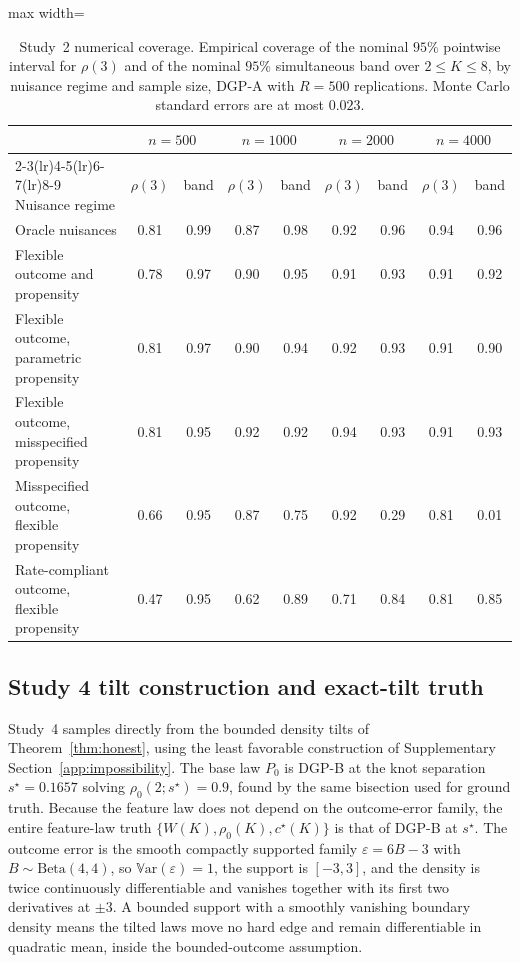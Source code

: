 \documentclass[11pt]{article}
\newcommand{\Var}{\mathbb V\mathrm{ar}}
\newcommand{\eps}{\varepsilon}
\begin{document}
\begin{table}[t]
\centering
\caption{Study~2 numerical coverage. Empirical coverage of the nominal $95\%$ pointwise interval for $\rho(3)$ and of the nominal $95\%$ simultaneous band over $2\le K\le8$, by nuisance regime and sample size, DGP-A with $R=500$ replications. Monte Carlo standard errors are at most $0.023$.}
\label{tab:sims:study2cov}
\begin{adjustbox}{max width=\textwidth}
\begin{tabular}{l cc cc cc cc}
\toprule
& \multicolumn{2}{c}{$n=500$} & \multicolumn{2}{c}{$n=1000$} & \multicolumn{2}{c}{$n=2000$} & \multicolumn{2}{c}{$n=4000$}\\
\cmidrule(lr){2-3}\cmidrule(lr){4-5}\cmidrule(lr){6-7}\cmidrule(lr){8-9}
Nuisance regime & $\rho(3)$ & band & $\rho(3)$ & band & $\rho(3)$ & band & $\rho(3)$ & band\\
\midrule
Oracle nuisances & 0.81 & 0.99 & 0.87 & 0.98 & 0.92 & 0.96 & 0.94 & 0.96\\
Flexible outcome and propensity & 0.78 & 0.97 & 0.90 & 0.95 & 0.91 & 0.93 & 0.91 & 0.92\\
Flexible outcome, parametric propensity & 0.81 & 0.97 & 0.90 & 0.94 & 0.92 & 0.93 & 0.91 & 0.90\\
Flexible outcome, misspecified propensity & 0.81 & 0.95 & 0.92 & 0.92 & 0.94 & 0.93 & 0.91 & 0.93\\
Misspecified outcome, flexible propensity & 0.66 & 0.95 & 0.87 & 0.75 & 0.92 & 0.29 & 0.81 & 0.01\\
Rate-compliant outcome, flexible propensity & 0.47 & 0.95 & 0.62 & 0.89 & 0.71 & 0.84 & 0.81 & 0.85\\
\bottomrule
\end{tabular}
\end{adjustbox}
\end{table}

\subsection{Study 4 tilt construction and exact-tilt truth}\label{sec:sims:study4b_supp}

Study~4 samples directly from the bounded density tilts of Theorem~\ref{thm:honest}, using the least favorable construction of Supplementary Section~\ref{app:impossibility}. The base law $P_0$ is DGP-B at the knot separation $s^\star=0.1657$ solving $\rho_0(2;s^\star)=0.9$, found by the same bisection used for ground truth. Because the feature law does not depend on the outcome-error family, the entire feature-law truth $\{W(K),\rho_0(K),c^\star(K)\}$ is that of DGP-B at $s^\star$. The outcome error is the smooth compactly supported family $\eps=6B-3$ with $B\sim\mathrm{Beta}(4,4)$, so $\Var(\eps)=1$, the support is $[-3,3]$, and the density is twice continuously differentiable and vanishes together with its first two derivatives at $\pm3$. A bounded support with a smoothly vanishing boundary density means the tilted laws move no hard edge and remain differentiable in quadratic mean, inside the bounded-outcome assumption.
\end{document}
